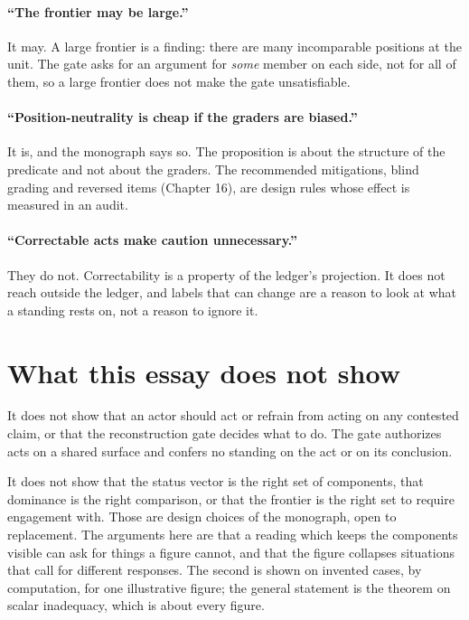 \documentclass[11pt]{article}
\begin{document}
\paragraph{``The frontier may be large.''} It may. A large frontier is a finding: there are many incomparable positions at the unit. The gate asks for an argument for \emph{some} member on each side, not for all of them, so a large frontier does not make the gate unsatisfiable.

\paragraph{``Position-neutrality is cheap if the graders are biased.''} It is, and the monograph says so. The proposition is about the structure of the predicate and not about the graders. The recommended mitigations, blind grading and reversed items (Chapter 16), are design rules whose effect is measured in an audit.

\paragraph{``Correctable acts make caution unnecessary.''} They do not. Correctability is a property of the ledger's projection. It does not reach outside the ledger, and labels that can change are a reason to look at what a standing rests on, not a reason to ignore it.

\section{What this essay does not show}\label{sec:limits}

It does not show that an actor should act or refrain from acting on any contested claim, or that the reconstruction gate decides what to do. The gate authorizes acts on a shared surface and confers no standing on the act or on its conclusion.

It does not show that the status vector is the right set of components, that dominance is the right comparison, or that the frontier is the right set to require engagement with. Those are design choices of the monograph, open to replacement. The arguments here are that a reading which keeps the components visible can ask for things a figure cannot, and that the figure collapses situations that call for different responses. The second is shown on invented cases, by computation, for one illustrative figure; the general statement is the theorem on scalar inadequacy, which is about every figure.
\end{document}
